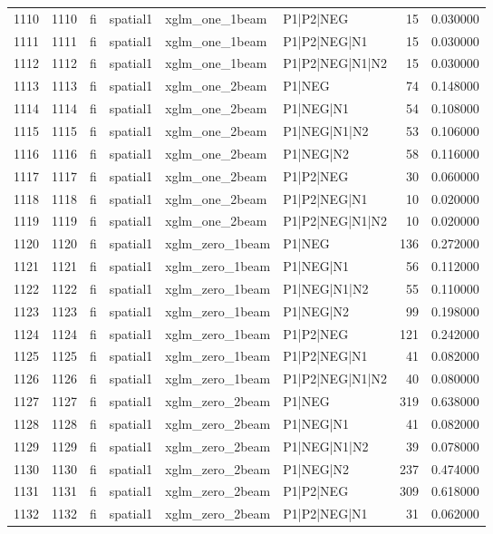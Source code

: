 \begin{tabular}{lrllllrr}
1110 & 1110 & fi & spatial1 & xglm_one_1beam & P1|P2|NEG & 15 & 0.030000 \\
1111 & 1111 & fi & spatial1 & xglm_one_1beam & P1|P2|NEG|N1 & 15 & 0.030000 \\
1112 & 1112 & fi & spatial1 & xglm_one_1beam & P1|P2|NEG|N1|N2 & 15 & 0.030000 \\
1113 & 1113 & fi & spatial1 & xglm_one_2beam & P1|NEG & 74 & 0.148000 \\
1114 & 1114 & fi & spatial1 & xglm_one_2beam & P1|NEG|N1 & 54 & 0.108000 \\
1115 & 1115 & fi & spatial1 & xglm_one_2beam & P1|NEG|N1|N2 & 53 & 0.106000 \\
1116 & 1116 & fi & spatial1 & xglm_one_2beam & P1|NEG|N2 & 58 & 0.116000 \\
1117 & 1117 & fi & spatial1 & xglm_one_2beam & P1|P2|NEG & 30 & 0.060000 \\
1118 & 1118 & fi & spatial1 & xglm_one_2beam & P1|P2|NEG|N1 & 10 & 0.020000 \\
1119 & 1119 & fi & spatial1 & xglm_one_2beam & P1|P2|NEG|N1|N2 & 10 & 0.020000 \\
1120 & 1120 & fi & spatial1 & xglm_zero_1beam & P1|NEG & 136 & 0.272000 \\
1121 & 1121 & fi & spatial1 & xglm_zero_1beam & P1|NEG|N1 & 56 & 0.112000 \\
1122 & 1122 & fi & spatial1 & xglm_zero_1beam & P1|NEG|N1|N2 & 55 & 0.110000 \\
1123 & 1123 & fi & spatial1 & xglm_zero_1beam & P1|NEG|N2 & 99 & 0.198000 \\
1124 & 1124 & fi & spatial1 & xglm_zero_1beam & P1|P2|NEG & 121 & 0.242000 \\
1125 & 1125 & fi & spatial1 & xglm_zero_1beam & P1|P2|NEG|N1 & 41 & 0.082000 \\
1126 & 1126 & fi & spatial1 & xglm_zero_1beam & P1|P2|NEG|N1|N2 & 40 & 0.080000 \\
1127 & 1127 & fi & spatial1 & xglm_zero_2beam & P1|NEG & 319 & 0.638000 \\
1128 & 1128 & fi & spatial1 & xglm_zero_2beam & P1|NEG|N1 & 41 & 0.082000 \\
1129 & 1129 & fi & spatial1 & xglm_zero_2beam & P1|NEG|N1|N2 & 39 & 0.078000 \\
1130 & 1130 & fi & spatial1 & xglm_zero_2beam & P1|NEG|N2 & 237 & 0.474000 \\
1131 & 1131 & fi & spatial1 & xglm_zero_2beam & P1|P2|NEG & 309 & 0.618000 \\
1132 & 1132 & fi & spatial1 & xglm_zero_2beam & P1|P2|NEG|N1 & 31 & 0.062000 \\

\end{tabular}
